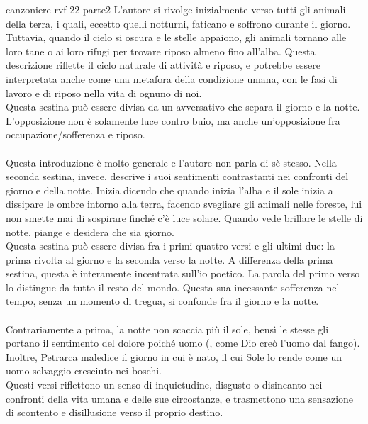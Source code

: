 \documentclass[preview]{standalone}
\begin{document}
\begin{snippet}{canzoniere-rvf-22-parte2}
     L'autore si rivolge inizialmente verso tutti gli animali della terra,
    i quali, eccetto quelli notturni, faticano e soffrono durante il giorno.
    Tuttavia, quando il cielo si oscura e le stelle appaiono,
    gli animali tornano alle loro tane o ai loro rifugi per trovare
    riposo almeno fino all'alba.
    Questa descrizione riflette il ciclo naturale di attività e riposo,
    e potrebbe essere interpretata anche come una metafora della condizione umana,
    con le fasi di lavoro e di riposo nella vita di ognuno di noi. \\
    Questa sestina può essere divisa da un  avversativo che separa il giorno e la notte.
    L'opposizione non è solamente luce contro buio, ma anche un'opposizione fra occupazione/sofferenza e riposo.
    \\\\
     Questa introduzione è molto generale e l'autore non parla di sè stesso.
    Nella seconda sestina, invece, descrive i suoi sentimenti contrastanti nei confronti
    del giorno e della notte.
    Inizia dicendo che quando inizia l'alba e il sole inizia a dissipare
    le ombre intorno alla terra, facendo svegliare gli animali nelle foreste,
    lui non smette mai di sospirare finché c'è luce solare.
    Quando vede brillare le stelle di notte, piange e desidera che sia giorno. \\
    Questa sestina può essere divisa fra i primi quattro versi e gli ultimi due:
    la prima rivolta al giorno e la seconda verso la notte.
    A differenza della prima sestina, questa è interamente incentrata sull'io poetico.
    La parola  del primo verso lo distingue da tutto il resto del mondo.
    Questa sua incessante sofferenza nel tempo, senza un momento di tregua,
    si confonde fra il giorno e la notte.
    \\\\
     Contrariamente a prima, la notte non scaccia più il sole, bensì
    le stesse gli portano il sentimento del dolore poiché uomo (,
    come Dio creò l'uomo dal fango).
    Inoltre, Petrarca maledice il giorno in cui è nato, il cui Sole lo rende come un uomo selvaggio cresciuto nei boschi.
    \\
    Questi versi riflettono un senso di inquietudine,
    disgusto o disincanto nei confronti della vita umana e delle sue circostanze,
    e trasmettono una sensazione di scontento e disillusione verso il proprio destino.

\end{snippet}
\end{document}
